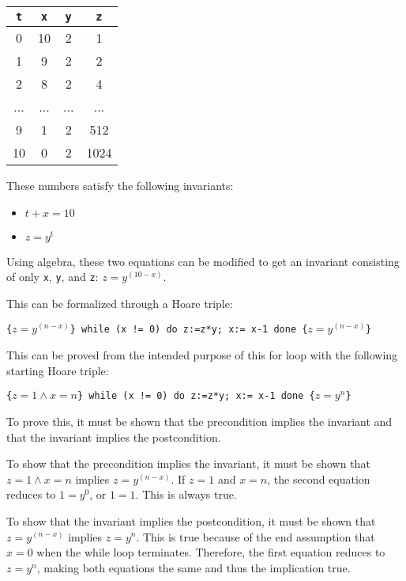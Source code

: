 \documentclass{article}
\theoremstyle{theorem}
\theoremstyle{definition}
\theoremstyle{remark}
\begin{document}
\begin{center}
\begin{tabular}{ | c | c | c | c| }
    \hline
    \texttt{t} & \texttt{x} & \texttt{y} & \texttt{z} \\
    \hline\hline
    0 & 10 & 2 & 1 \\ 
    \hline
    1 & 9 & 2 & 2 \\
    \hline
    2 & 8 & 2 & 4 \\
    \hline
    ... & ... & ... & ... \\
    \hline
    9 & 1 & 2 & 512 \\
    \hline
    10 & 0 & 2 & 1024 \\
    \hline
\end{tabular}
\end{center}

These numbers satisfy the following invariants:

\begin{itemize}
    \item $t + x = 10$
    \item $z = y ^ t$
\end{itemize}

Using algebra, these two equations can be modified to get an invariant consisting of only \texttt{x}, \texttt{y}, and \texttt{z}: $z = y^{(10 - x)}$.

This can be formalized through a Hoare triple:

\texttt{\{$z = y^{(n - x)}$\}  while (x != 0) do z:=z*y;  x:= x-1 done  \{$z = y^{(n - x)}$\}}

This can be proved from the intended purpose of this for loop with the following starting Hoare triple:

\texttt{\{$z=1 \land x=n$\}  while (x != 0) do z:=z*y;  x:= x-1 done  \{$z = y^n$\}}

To prove this, it must be shown that the precondition implies the invariant and that the invariant implies the postcondition.

To show that the precondition implies the invariant, it must be shown that $z=1 \land x=n$ implies $z = y^{(n - x)}$. If $z=1$ and $x=n$, the second equation reduces to $1=y^0$, or $1=1$. This is always true.

To show that the invariant implies the postcondition, it must be shown that $z = y^{(n - x)}$ implies $z = y^n$. This is true because of the end assumption that $x=0$ when the while loop terminates. Therefore, the first equation reduces to $z = y^n$, making both equations the same and thus the implication true.
\end{document}
